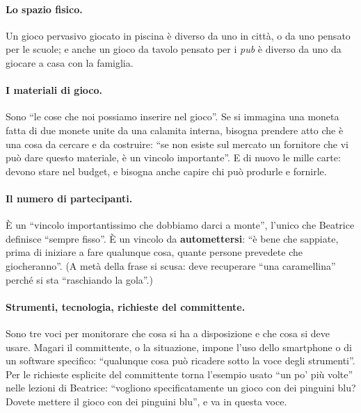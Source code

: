 \paragraph{Lo spazio fisico.} Un gioco pervasivo giocato in piscina è diverso da uno
in città, o da uno pensato per le scuole; e anche un gioco da tavolo pensato per i
\emph{pub} è diverso da uno da giocare a casa con la famiglia.

\paragraph{I materiali di gioco.} Sono ``le cose che noi possiamo inserire nel
gioco''. Se si immagina una moneta fatta di due monete unite da una calamita interna,
bisogna prendere atto che è una cosa da cercare e da costruire: ``se non esiste sul
mercato un fornitore che vi può dare questo materiale, è un vincolo importante''. E di
nuovo le mille carte: devono stare nel budget, e bisogna anche capire chi può
produrle e fornirle.

\paragraph{Il numero di partecipanti.} È un ``vincolo importantissimo che dobbiamo
darci a monte'', l'unico che Beatrice definisce ``sempre fisso''. È un vincolo da
\textbf{automettersi}: ``è bene che sappiate, prima di iniziare a fare qualunque cosa,
quante persone prevedete che giocheranno''. (A metà della frase si scusa: deve
recuperare ``una caramellina'' perché si sta ``raschiando la gola''.)

\paragraph{Strumenti, tecnologia, richieste del committente.} Sono tre voci per
monitorare che cosa si ha a disposizione e che cosa si deve usare. Magari il
committente, o la situazione, impone l'uso dello smartphone o di un software
specifico: ``qualunque cosa può ricadere sotto la voce degli strumenti''. Per le
richieste esplicite del committente torna l'esempio usato ``un po' più volte'' nelle
lezioni di Beatrice: ``vogliono specificatamente un gioco con dei pinguini blu?
Dovete mettere il gioco con dei pinguini blu'', e va in questa voce.

